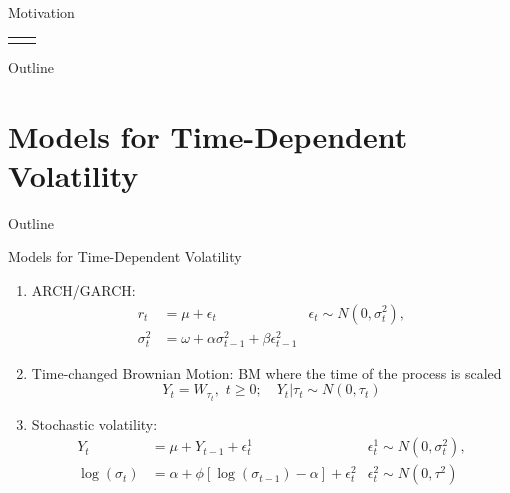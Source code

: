 \documentclass{beamer}
\begin{document}
\begin{frame}{Motivation}
\begin{tabular}{cc}
\begin{minipage}{0.5\textwidth}
\begin{center}
	\end{center}
\end{minipage}
\end{tabular}

\end{frame}





\begin{frame}{Outline}
  \tableofcontents
\end{frame}

\section{Models for Time-Dependent Volatility}

\begin{frame}{Outline}
  \tableofcontents[currentsection]
\end{frame}

\begin{frame}{Models for Time-Dependent Volatility}
	\begin{enumerate}[1.]
		\item ARCH/GARCH: 
			\begin{align*}
				r_t &= \mu + \epsilon_t & \epsilon_t \sim N(0, \sigma_t^2), \\
				\sigma^2_t &= \omega + \alpha\sigma^2_{t-1} + \beta \epsilon^2_{t-1}	&
			\end{align*}

		\item Time-changed Brownian Motion: BM where the time of the process is scaled 
\[ Y_t = W_{\tau_t}, \,\, t \geq 0; \quad Y_t | \tau_t \sim N(0, \tau_t) \]

		\item Stochastic volatility: 
			\begin{align*}
				Y_t 			&= \mu + Y_{t-1} + \epsilon_t^1 								 & \epsilon_t^1 \sim N(0, \sigma_t^2), \\
				\log(\sigma_t) &= \alpha + \phi \left[ \log(\sigma_{t-1}) - \alpha \right] + \epsilon_t^2  & \epsilon_t^2 \sim N(0, \tau^2)
			\end{align*}
	\end{enumerate}
\end{frame}
	
\end{document}
